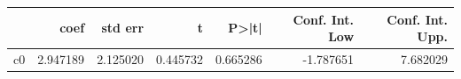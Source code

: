 \begin{tabular}{lrrrrrr}
\toprule
 & coef & std err & t & P>|t| & Conf. Int. Low & Conf. Int. Upp. \\
\midrule
c0 & 2.947189 & 2.125020 & 0.445732 & 0.665286 & -1.787651 & 7.682029 \\
\bottomrule
\end{tabular}